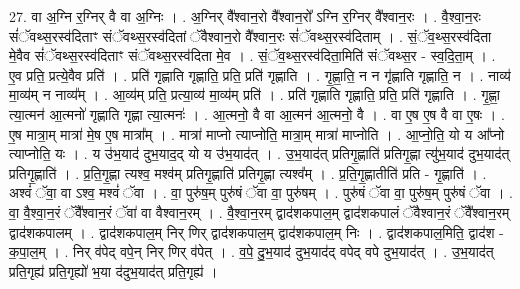 \documentclass[17pt]{extarticle}
\begin{document}
27. वा अ॒ग्नि र॒ग्निर् वै वा अ॒ग्निः । . अ॒ग्निर् वै᳚श्वान॒रो वै᳚श्वान॒रो᳚ ऽग्नि र॒ग्निर् वै᳚श्वान॒रः । . वै॒श्वा॒न॒रः सं॑ॅवथ्स॒रस्व॑दिताꣳ संॅवथ्स॒रस्व॑दितां ॅवैश्वान॒रो वै᳚श्वान॒रः सं॑ॅवथ्स॒रस्व॑दिताम् । . सं॒ॅव॒थ्स॒रस्व॑दिता मे॒वैव सं॑ॅवथ्स॒रस्व॑दिताꣳ संॅवथ्स॒रस्व॑दिता मे॒व । . सं॒ॅव॒थ्स॒रस्व॑दिता॒मिति॑ संॅवथ्स॒र - स्व॒दि॒ता॒म् । . ए॒व प्रति॒ प्रत्ये॒वैव प्रति॑ । . प्रति॑ गृह्णाति गृह्णाति॒ प्रति॒ प्रति॑ गृह्णाति । . गृ॒ह्णा॒ति॒ न न गृ॑ह्णाति गृह्णाति॒ न । . नाव्य॑ मा॒व्य॑म् न नाव्य᳚म् । . आ॒व्य॑म् प्रति॒ प्रत्या॒व्य॑ मा॒व्य॑म् प्रति॑ । . प्रति॑ गृह्णाति गृह्णाति॒ प्रति॒ प्रति॑ गृह्णाति । . गृ॒ह्णा॒ त्या॒त्मन॑ आ॒त्मनो॑ गृह्णाति गृह्णा त्या॒त्मनः॑ । . आ॒त्मनो॒ वै वा आ॒त्मन॑ आ॒त्मनो॒ वै । . वा ए॒ष ए॒ष वै वा ए॒षः । . ए॒ष मात्रा॒म् मात्रा॑ मे॒ष ए॒ष मात्रा᳚म् । . मात्रा॑ माप्नो त्याप्नोति॒ मात्रा॒म् मात्रा॑ माप्नोति । . आ॒प्नो॒ति॒ यो य आ᳚प्नो त्याप्नोति॒ यः । . य उ॑भ॒याद॑ दुभ॒याद॒द् यो य उ॑भ॒याद॑त् । . उ॒भ॒याद॑त् प्रतिगृ॒ह्णाति॑ प्रतिगृ॒ह्णा त्यु॑भ॒याद॑ दुभ॒याद॑त् प्रतिगृ॒ह्णाति॑ । . प्र॒ति॒गृ॒ह्णा त्यश्व॒ मश्व॑म् प्रतिगृ॒ह्णाति॑ प्रतिगृ॒ह्णा त्यश्व᳚म् । . प्र॒ति॒गृ॒ह्णातीति॑ प्रति - गृ॒ह्णाति॑ । . अश्वं॑ ॅवा॒ वा ऽश्व॒ मश्वं॑ ॅवा । . वा॒ पुरु॑ष॒म् पुरु॑षं ॅवा वा॒ पुरु॑षम् । . पुरु॑षं ॅवा वा॒ पुरु॑ष॒म् पुरु॑षं ॅवा । . वा॒ वै॒श्वा॒न॒रं ॅवै᳚श्वान॒रं ॅवा॑ वा वैश्वान॒रम् । . वै॒श्वा॒न॒रम् द्वाद॑शकपाल॒म् द्वाद॑शकपालं ॅवैश्वान॒रं ॅवै᳚श्वान॒रम् द्वाद॑शकपालम् । . द्वाद॑शकपाल॒म् निर् णिर् द्वाद॑शकपाल॒म् द्वाद॑शकपाल॒म् निः । . द्वाद॑शकपाल॒मिति॒ द्वाद॑श - क॒पा॒ल॒म् । . निर् व॑पेद् वपे॒न् निर् णिर् व॑पेत् । . व॒पे॒ दु॒भ॒याद॑ दुभ॒याद॑द् वपेद् वपे दुभ॒याद॑त् । . उ॒भ॒याद॑त् प्रति॒गृह्य॑ प्रति॒गृह्यो॑ भ॒या द॑दुभ॒याद॑त् प्रति॒गृह्य॑ । \newline
\end{document}
